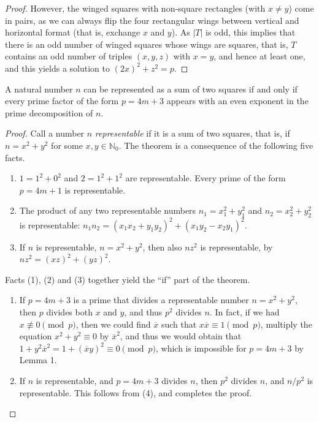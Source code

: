\begin{proof}
However, the winged squares with non-square rectangles (with $x \neq y$) come in pairs, as we can
always flip the four rectangular wings between vertical and horizontal format
(that is, exchange $x$ and $y$). As $|T|$ is odd, this implies that there is an odd number of winged
squares whose wings are squares, that is, $T$ contains an odd number of triples $(x, y, z)$
with $x = y$, and hence at least one, and this yields a solution to $(2x)^2 + z^2 = p$.
\end{proof}

\begin{theorem}
  \label{sum_of_two_squares}
  A natural number \(n\) can be represented as a sum of two squares
  if and only if every prime factor of the form \(p = 4m + 3\) appears with an
  even exponent in the prime decomposition of \(n\).
\end{theorem}
\begin{proof}
  Call a number $n$ \textit{representable} if it is a sum of two squares, that is, if $n = x^2 + y^2$ for some $x, y \in \mathbb{N}_0$. The theorem is a consequence of the following five facts.
  \begin{enumerate}[label=(\arabic*)]
  	\item $1 = 1^2 + 0^2$ and $2 = 1^2 + 1^2$ are representable. Every prime of the form $p = 4m + 1$ is representable.
  	\item The product of any two representable numbers $n_1 = x_1^2 + y_1^2$ and $n_2 = x_2^2 + y_2^2$ is representable: $n_1 n_2 = (x_1 x_2 + y_1 y_2)^2 + (x_1 y_2 - x_2 y_1)^2$.
  	\item If $n$ is representable, $n = x^2 + y^2$, then also $nz^2$ is representable, by $nz^2 = (xz)^2 + (yz)^2$.
  \end{enumerate}
  Facts (1), (2) and (3) together yield the ``if'' part of the theorem.
  \begin{enumerate}[start=4,label=(\arabic*)]
  	\item If $p = 4m + 3$ is a prime that divides a representable number $n = x^2 + y^2$, then $p$ divides both $x$ and $y$, and thus $p^2$ divides $n$. In fact, if we had $x \not\equiv 0 \pmod{p}$, then we could find $\overline{x}$ such that $x\overline{x} \equiv 1 \pmod{p}$, multiply the equation $x^2 + y^2 \equiv 0$ by $\overline{x}^2$, and thus we would obtain that $1 + y^2 \overline{x}^2 = 1 + \left(\overline{x} y\right)^2 \equiv 0 \pmod{p}$, which is impossible for $p = 4m + 3$ by Lemma 1.
  	\item If $n$ is representable, and $p = 4m + 3$ divides $n$, then $p^2$ divides $n$, and $n/p^2$ is representable. This follows from (4), and completes the proof. \qedhere
  \end{enumerate}
\end{proof}


